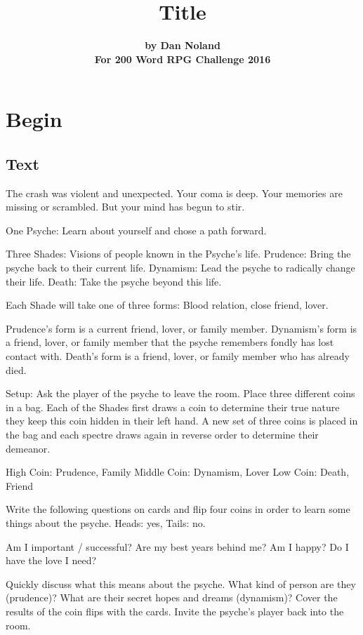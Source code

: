 \documentclass[letterpaper,12pt,landscape,twocolumn]{book}
\title{\Huge \textbf{Title} }
\author{ \textbf{by Dan Noland} \\ \textbf{For 200 Word RPG Challenge
    2016}}
\begin{document}
\RaggedRight
\frontmatter
\maketitle

\let\cleardoublepage\clearpage

\mainmatter
\chapter{Begin}
\section{Text}

The crash was violent and unexpected. Your coma is
deep. Your memories are missing or scrambled. But your mind has begun
to stir. 

One Psyche: Learn about yourself and chose a path forward.

Three Shades: Visions of people known in the Psyche's life.
Prudence: Bring the psyche back to their current life.
Dynamism: Lead the psyche to radically change their life.
Death: Take the psyche beyond this life.

Each Shade will take one of three forms: Blood relation, close friend, lover. 

Prudence's form is a current friend, lover, or family member.
Dynamism's form is a friend, lover, or family member that the psyche
remembers fondly has lost contact with.
Death's form is a friend, lover, or family member who has already died.

Setup: Ask the player of the psyche to leave the room. Place three
different coins in a bag. Each of the Shades first 
draws a coin to determine their true nature they keep this coin hidden
in their left hand. A new set of three coins is placed in the bag and
each spectre draws again in reverse order to determine their demeanor.   

High Coin:  Prudence, Family
Middle Coin: Dynamism, Lover
Low Coin: Death, Friend

Write the following questions on cards and flip four coins in order to
learn some things about the psyche. Heads: yes, Tails: no.

Am I important / successful?
Are my best years behind me?
Am I happy?
Do I have the love I need?

Quickly discuss what this means about the psyche. What kind of person
are they (prudence)? What are their secret hopes and dreams
(dynamism)? 
Cover the results of the coin flips with the cards. Invite the
psyche's player back into the room. 
\end{document}
